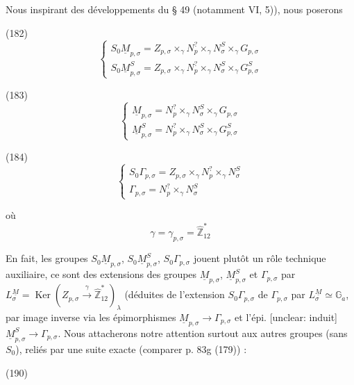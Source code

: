 Nous inspirant des développements du § 49 (notamment VI, 5)), nous poserons

(182)
$$ \begin{cases}
S_0 \underline{M}_{p,\sigma} = Z_{p,\sigma} \times_{\gamma} N_{p}^? \times_{\gamma} N_{\sigma}^S \times_{\gamma} G_{p,\sigma} \\
S_0 \underline{M}_{p,\sigma}^S = Z_{p,\sigma} \times_{\gamma} N_{p}^? \times_{\gamma} N_{\sigma}^S \times_{\gamma} G_{p,\sigma}^S
\end{cases} $$

(183)
$$ \begin{cases}
\underline{M}_{p,\sigma} = N_{p}^? \times_{\gamma} N_{\sigma}^S \times_{\gamma} G_{p,\sigma} \\
\underline{M}_{p,\sigma}^S = N_{p}^? \times_{\gamma} N_{\sigma}^S \times_{\gamma} G_{p,\sigma}^S
\end{cases} $$

(184)
$$ \begin{cases}
S_0 \Gamma_{p,\sigma} = Z_{p,\sigma} \times_{\gamma} N_{p}^? \times_{\gamma} N_{\sigma}^S \\
\Gamma_{p,\sigma} = N_{p}^? \times_{\gamma} N_{\sigma}^S
\end{cases} $$

où
$$ \gamma = \gamma_{p,\sigma} = \hat{\mathbb{Z}}_{12}^* $$

En fait, les groupes $S_0 \underline{M}_{p,\sigma}$, $S_0 \underline{M}_{p,\sigma}^S$, $S_0 \Gamma_{p,\sigma}$ jouent plutôt un rôle technique auxiliaire, ce sont des extensions des groupes $\underline{M}_{p,\sigma}$, $\underline{M}_{p,\sigma}^S$ et $\Gamma_{p,\sigma}$ par $L_{\sigma}^{\underline{M}} = \operatorname{Ker}(Z_{p,\sigma} \xrightarrow{\gamma} \hat{\mathbb{Z}}_{12}^*)_{\lambda}$ (déduites de l'extension $S_0 \Gamma_{p,\sigma}$ de $\Gamma_{p,\sigma}$ par $L_{\sigma}^{\underline{M}} \simeq \mathbb{G}_a$, par image inverse via les épimorphismes $\underline{M}_{p,\sigma} \to \Gamma_{p,\sigma}$ et l'épi. [unclear: induit] $\underline{M}_{p,\sigma}^S \to \Gamma_{p,\sigma}$.
Nous attacherons notre attention surtout aux autres groupes (sans $S_0$), reliés par une suite exacte (comparer p. 83g (179)) :

\newpage


(190)


